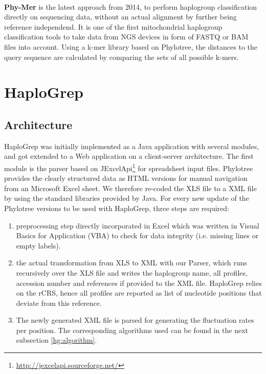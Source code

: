 \\
\textbf{Phy-Mer} is the latest approach from 2014, to perform haplogroup classification directly on sequencing data, without an actual alignment by further being reference independend. It is one of the first mitochondrial haplogroup classification tools to take data from NGS devices in form of FASTQ or BAM files into account. Using a k-mer library based on Phylotree, the distances to the query sequence are calculated by comparing the sets of all possible k-mers. \\

\section{HaploGrep}\label{hg:haplogrep}
\subsection{Architecture}
HaploGrep was initially implemented as a Java application with several modules, and got extended to a Web application on a client-server architecture. The first module is the parser based on JExcelApi\footnote{\url{http://jexcelapi.sourceforge.net/}} for spreadsheet input files. Phylotree provides the clearly structured data as HTML versions for manual navigation from an Microsoft Excel sheet. We therefore re-coded the XLS file to a XML file by using the standard libraries provided by Java. For every new update of the Phylotree versions to be used with HaploGrep, three steps are required: 
\begin{enumerate}
\item preprocessing step directly incorporated in Excel which was written in Visual Basics for Application (VBA) to check for data integrity (i.e. missing lines or empty labels). 
\item the actual transformation from XLS to XML with our Parser, which runs recursively over the XLS file and writes the haplogroup name, all profiles, accession number and references if provided to the XML file. HaploGrep relies on the rCRS, hence all profiles are reported as list of nucleotide positions that deviate from this reference. 
\item The newly generated XML file is parsed for generating the fluctuation rates per position. The corresponding algorithms used can be found in the next subsection \ref{hg:algorithm}.
\end{enumerate}
